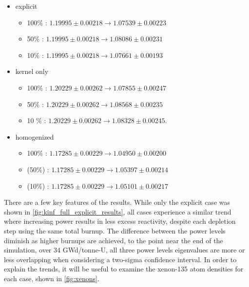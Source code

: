 \documentclass[letterpaper]{physor2024}
\begin{document}
\begin{itemize}
    \item explicit
    \begin{itemize}
        \item 100\% \kinf: $1.19995 \pm 0.00218 \xrightarrow{} 1.07539 \pm 0.00223$
        \item 50\% \kinf: $1.19995 \pm 0.00218 \xrightarrow{} 1.08086 \pm 0.00231$ \item 10\% \kinf:  $1.19995 \pm 0.00218 \xrightarrow{} 1.07661 \pm 0.00193$
    \end{itemize}
    \item kernel only
    \begin{itemize}
        \item 100\% \kinf: $1.20229 \pm 0.00262 \xrightarrow{} 1.07855 \pm 0.00247$
        \item 50\% \kinf: $1.20229 \pm 0.00262 \xrightarrow{} 1.08568 \pm 0.00235$
        \item 10 \% \kinf: $1.20229 \pm 0.00262 \xrightarrow{} 1.08328 \pm  0.00245$.
    \end{itemize}
    \item homogenized
    \begin{itemize}
        \item 100\% \kinf: $ 1.17285 \pm 0.00229 \xrightarrow{} 1.04950 \pm 0.00200 $
        \item (50\%) \kinf: $ 1.17285 \pm 0.00229 \xrightarrow{} 1.05397 \pm 0.00214 $
        \item (10\%) \kinf: $1.17285 \pm 0.00229 \xrightarrow{} 1.05101 \pm 0.00217$
    \end{itemize}
\end{itemize}

There are a few key features of the results. While only the explicit case was shown in \cref{fig:kinf_full_explicit_results}, all cases experience a similar trend where increasing power results in less excess reactivity, despite each depletion step using the same total burnup. The difference between the power levels diminish as higher burnups are achieved, to the point near the end of the simulation, over 34 GWd/tonne-U, all three power levels eigenvalues are more or less overlapping when considering a two-sigma confidence interval. In order to explain the trends, it will be useful to examine the xenon-135 atom densities for each case, shown in \cref{fig:xenons}.
\end{document}
